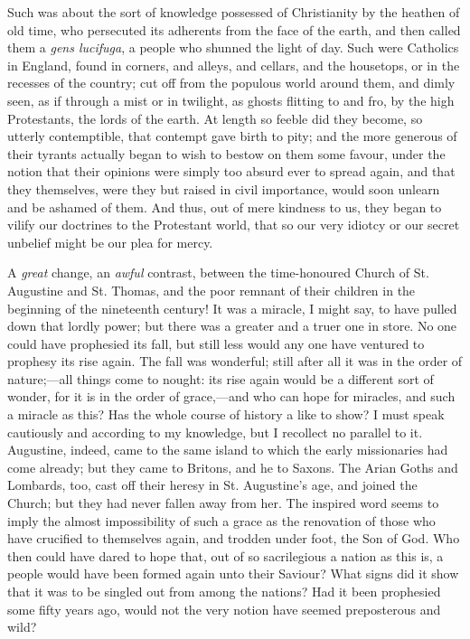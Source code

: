 Such was about the sort of knowledge possessed of
Christianity by the heathen of old time, who persecuted
its adherents from the face of the earth, and then called
them a \emph{gens lucifuga}, a people who shunned the
light of day. Such were Catholics in England, found in
corners, and alleys, and cellars, and the housetops, or
in the recesses of the country; cut off from the populous
world around them, and dimly seen, as if through a mist
or in twilight, as ghosts flitting to and fro, by the
high Protestants, the lords of the earth. At length so
feeble did they become, so utterly contemptible, that
contempt gave birth to pity; and the more generous of
their tyrants actually began to wish to bestow on them
some favour, under the notion that their opinions were
simply too absurd ever to spread again, and that they
themselves, were they but raised in civil importance,
would soon unlearn and be ashamed of them. And thus, out
of mere kindness to us, they began to vilify our
doctrines to the Protestant world, that so our very
idiotcy or our secret unbelief might be our plea for
mercy.

A \emph{great} change, an \emph{awful} contrast,
between the time-honoured Church of St. Augustine and St.
Thomas, and the poor remnant of their children in the
beginning of the nineteenth century! It was a miracle, I
might say, to have pulled down that lordly power; but
there was a greater and a truer one in store. No one
could have prophesied its fall, but still less would any
one have ventured to prophesy its rise again. The fall
was wonderful; still after all it was in the order of
nature;—all things come to nought: its rise again
would be a different sort of wonder, for it is in the
order of grace,—and who can hope for miracles, and
such a miracle as this? Has the whole course of history a
like to show? I must speak cautiously and according to my
knowledge, but I recollect no parallel to it. Augustine,
indeed, came to the same island to which the early
missionaries had come already; but they came to Britons,
and he to Saxons. The Arian Goths and Lombards, too, cast
off their heresy in St. Augustine's age, and joined the
Church; but they had never fallen away from her. The
inspired word seems to imply the almost impossibility of
such a grace as the renovation of those who have
crucified to themselves again, and trodden under foot,
the Son of God. Who then could have dared to hope that,
out of so sacrilegious a nation as this is, a people
would have been formed again unto their Saviour? What
signs did it show that it was to be singled out from
among the nations? Had it been prophesied some fifty
years ago, would not the very notion have seemed
preposterous and wild?

